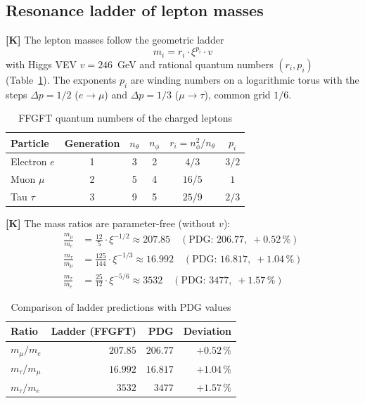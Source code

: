 \subsection{Resonance ladder of lepton masses}

\textbf{[K]} The lepton masses follow the geometric ladder
\begin{equation}
  m_i = r_i \cdot \xi^{p_i} \cdot v
\end{equation}
with Higgs VEV $v = 246$~GeV and rational quantum numbers
$(r_i, p_i)$ (Table~\ref{tab:lepton_qz_en}). The exponents $p_i$
are winding numbers on a logarithmic torus with the steps
$\Delta p = 1/2$ ($e \to \mu$) and $\Delta p = 1/3$ ($\mu \to \tau$),
common grid $1/6$.

\begin{table}[h]
\centering
\caption{FFGFT quantum numbers of the charged leptons}
\label{tab:lepton_qz_en}
\begin{tabular}{lccccc}
\toprule
Particle & Generation & $n_\theta$ & $n_\phi$ &
  $r_i = n_\phi^2/n_\theta$ & $p_i$ \\
\midrule
Electron $e$  & 1 & 3 & 2 & $4/3$  & $3/2$ \\
Muon $\mu$    & 2 & 5 & 4 & $16/5$ & $1$   \\
Tau $\tau$    & 3 & 9 & 5 & $25/9$ & $2/3$ \\
\bottomrule
\end{tabular}
\end{table}

\textbf{[K]} The mass ratios are parameter-free (without $v$):
\begin{align}
  \frac{m_\mu}{m_e} &= \frac{12}{5} \cdot \xi^{-1/2}
    \approx 207.85 \quad (\text{PDG: } 206.77,\; +0.52\,\%) \\
  \frac{m_\tau}{m_\mu} &= \frac{125}{144} \cdot \xi^{-1/3}
    \approx 16.992 \quad (\text{PDG: } 16.817,\; +1.04\,\%) \\
  \frac{m_\tau}{m_e} &= \frac{25}{12} \cdot \xi^{-5/6}
    \approx 3532 \quad (\text{PDG: } 3477,\; +1.57\,\%)
\end{align}

\begin{table}[h]
\centering
\caption{Comparison of ladder predictions with PDG values}
\label{tab:massratios_en}
\begin{tabular}{lrrr}
\toprule
Ratio & Ladder (FFGFT) & PDG & Deviation \\
\midrule
$m_\mu/m_e$    & $207.85$ & $206.77$ & $+0.52\,\%$ \\
$m_\tau/m_\mu$ & $16.992$ & $16.817$ & $+1.04\,\%$ \\
$m_\tau/m_e$   & $3532$   & $3477$   & $+1.57\,\%$ \\
\bottomrule
\end{tabular}
\end{table}

